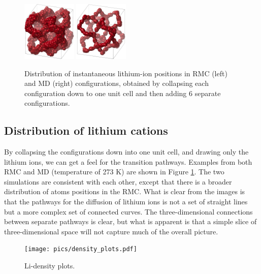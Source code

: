 \documentclass[twoside,twocolumn,9pt]{article}
\begin{document}
\begin{figure}[t]
\centering
\includegraphics[width=0.23\textwidth]{Pics/collapsed_RMC.png}
\includegraphics[width=0.23\textwidth]{Pics/collapsed_MD.png}
\caption{Distribution of instantaneous lithium-ion positions in RMC (left) and MD (right) configurations, obtained by collapsing each configuration down to one unit cell and then adding 6 separate configurations.}
\label{fig:collapsed}
\end{figure}


\subsection{Distribution of lithium cations}

By collapsing the configurations down into one unit cell, and drawing only the lithium ions, we can get a feel for the transition pathways. Examples from both RMC and MD (temperature of 273 K) are shown in Figure \ref{fig:collapsed}. The two simulations are consistent with each other, except that there is a broader distribution of atoms positions in the RMC. What is clear from the images is that the pathways for the diffusion of lithium ions is not a set of straight lines but a more complex set of connected curves. The three-dimensional connections between separate pathways is clear, but what is apparent is that a simple slice of three-dimensional space will not capture much of the overall picture.


\begin{figure}[t]
\begin{center}
\texttt{[image: pics/density\_plots.pdf]}
\label{fig:density_plots}
\caption{\label{fig:density_plots}  Li-density plots.}
\end{center}
\end{figure}
\end{document}
